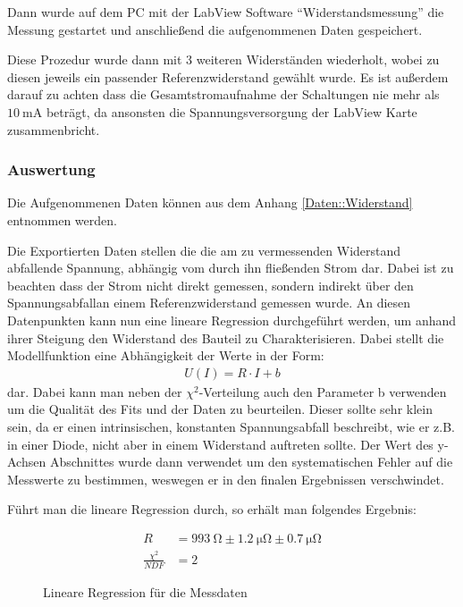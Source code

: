 \documentclass[12pt,twoside,a4paper]{scrartcl}
\begin{document}
				Dann wurde auf dem PC mit der LabView Software ``Widerstandsmessung'' die Messung gestartet und anschließend die aufgenommenen Daten gespeichert.

				Diese Prozedur wurde dann mit 3 weiteren Widerständen wiederholt, wobei zu diesen jeweils ein passender Referenzwiderstand gewählt wurde.
				Es ist außerdem darauf zu achten dass die Gesamtstromaufnahme der Schaltungen nie mehr als $\SI{10}{\milli \ampere}$ beträgt, da ansonsten die Spannungsversorgung der LabView Karte zusammenbricht.

			\subsubsection{Auswertung}

				Die Aufgenommenen Daten können aus dem Anhang \ref{Daten::Widerstand} entnommen werden.

				Die Exportierten Daten stellen die die am zu vermessenden Widerstand abfallende Spannung, abhängig vom durch ihn fließenden Strom dar. Dabei ist zu beachten dass der Strom nicht direkt gemessen, sondern indirekt über den Spannungsabfallan einem Referenzwiderstand gemessen wurde. An diesen Datenpunkten kann nun eine lineare Regression durchgeführt werden, um anhand ihrer Steigung den Widerstand des Bauteil zu Charakterisieren. Dabei stellt die Modellfunktion eine Abhängigkeit der Werte in der Form:
				\begin{align*}
					U(I) = R \cdot I + b
				\end{align*}
				dar. Dabei kann man neben der $\chi^2$-Verteilung auch den Parameter b verwenden um die Qualität des Fits und der Daten zu beurteilen. Dieser sollte sehr klein sein, da er einen intrinsischen, konstanten Spannungsabfall beschreibt, wie er z.B. in einer Diode, nicht aber in einem Widerstand auftreten sollte.
				Der Wert des y-Achsen Abschnittes wurde dann verwendet um den systematischen Fehler auf die Messwerte zu bestimmen, weswegen er in den finalen Ergebnissen verschwindet.

				Führt man die lineare Regression durch, so erhält man folgendes Ergebnis:

				\begin{figure}[H]
					\centering
					\begin{minipage}{0.69 \textwidth}
						\caption{Lineare Regression für die Messdaten}
					\end{minipage}
					\begin{minipage}{0.29 \textwidth}
						\begin{align*}
							R &= \SI{993}{\ohm} \pm \SI{1.2}{\micro \ohm} \pm \SI{0.7}{\micro \ohm}\\
							\frac{\chi^2}{NDF} &= 2
						\end{align*}
					\end{minipage}
			\end{figure}
\end{document}
